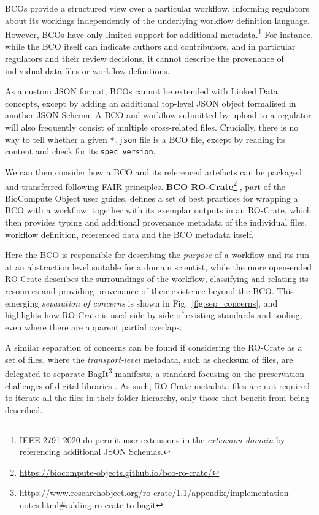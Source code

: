 \documentclass[ds,v1.1.2,openaccess]{iosart2x}%
\begin{document}
BCOs provide a structured view over a particular workflow, informing
regulators about its workings independently of the underlying workflow
definition language. However, BCOs have only limited support for
additional metadata.\footnote{IEEE 2791-2020 do permit user extensions in the \textit{extension
domain} by referencing additional JSON Schemas.} For instance, while the BCO itself can
indicate authors and contributors, and in particular regulators and
their review decisions, it cannot describe the provenance of individual
data files or workflow definitions.

As a custom JSON format, BCOs cannot be extended with Linked Data
concepts, except by adding an additional top-level JSON object
formalised in another JSON Schema. A BCO and workflow submitted by
upload to a regulator will also frequently consist of multiple
cross-related files. Crucially, there is no way to tell whether a given
\texttt{*.json} file is a BCO file, except by reading its content and check
for its \texttt{spec\_version}.

We can then consider how a BCO and its referenced artefacts can be
packaged and transferred following FAIR principles. \textbf{BCO
RO-Crate}\footnote{\url{https://biocompute-objects.github.io/bco-ro-crate/}} \cite{doi:10.5281/zenodo.4633732},
part of the BioCompute Object user guides, defines a set of best
practices for wrapping a BCO with a workflow, together with its
exemplar outputs in an RO-Crate, which then provides typing and
additional provenance metadata of the individual files, workflow
definition, referenced data and the BCO metadata itself.

Here the BCO is responsible for describing the \textit{purpose} of a workflow
and its run at an abstraction level suitable for a domain scientist,
while the more open-ended RO-Crate describes the surroundings of the
workflow, classifying and relating its resources and providing
provenance of their existence beyond the BCO. This emerging \textit{separation
of concerns} is shown in Fig.~\ref{fig:sep_concerns}, and highlights
how RO-Crate is used side-by-side of existing standards and tooling,
even where there are apparent partial overlaps.

A similar separation of concerns can be found if considering the
RO-Crate as a set of files, where the \textit{transport-level} metadata, such
as checksum of files, are delegated to separate
BagIt\footnote{\url{https://www.researchobject.org/ro-crate/1.1/appendix/implementation-notes.html\#adding-ro-crate-to-bagit}}
manifests, a standard focusing on the preservation challenges of
digital libraries \cite{doi:10.17487/rfc8493}. As such, RO-Crate metadata
files are not required to iterate all the files in their folder
hierarchy, only those that benefit from being described.
\end{document}
